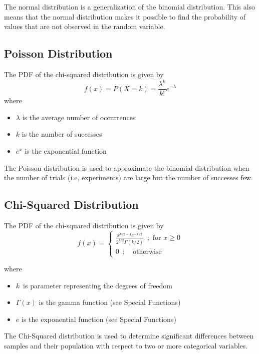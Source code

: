 \documentclass{article}
\begin{document}
The normal distribution is a generalization of the binomial distribution. This also means that the normal distribution makes it possible to find the probability of values that are not observed in the random variable.

\subsection{Poisson Distribution}
The PDF of the chi-squared distribution is given by
$$
f(x)=P(X=k)=\frac{\lambda^k}{k!}e^{-\lambda}
$$
where

\begin{itemize}
    \item $\lambda$ is the average number of occurrences
    \item $k$ is the number of successes
    \item $e^x$ is the exponential function
\end{itemize}

The Poisson distribution is used to approximate the binomial distribution when the number of trials (i.e, experiments) are large but the number of successes few.

\subsection{Chi-Squared Distribution}
The PDF of the chi-squared distribution is given by
$$
f(x) = \begin{cases} \frac{ x^{k/2-1}e^{-x/2} }{ 2^{k/2} \Gamma(k/2) } \enspace ; \text{ for } x \geq 0 \\ 0 \enspace ; \quad \text{otherwise} \end{cases}
$$ 

where

\begin{itemize}
    \item $k$\ is parameter representing the degrees of freedom
    \item $\Gamma(x)$ is the gamma function (see Special Functions)
    \item $e$ is the exponential function (see Special Functions)
\end{itemize}

The Chi-Squared distribution is used to determine significant differences between samples and their population with respect to two or more categorical variables.
\end{document}
